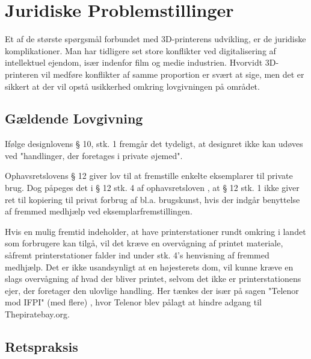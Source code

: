 
\section{Juridiske Problemstillinger}

Et af de største spørgsmål forbundet med 3D-printerens udvikling, er de juridiske komplikationer. Man har tidligere set store konflikter ved digitalisering af intellektuel ejendom, især indenfor film og medie industrien. Hvorvidt 3D-printeren vil medføre konflikter af samme proportion er svært at sige, men det er sikkert at der vil opstå usikkerhed omkring lovgivningen på området.

\subsection{Gældende Lovgivning}

Ifølge designlovens § 10, stk. 1 fremgår det tydeligt, at designret ikke kan udøves ved "handlinger, der foretages i private øjemed"\autocite{retsinformation.dk_designloven_2012}.

Ophavsretslovens § 12 giver lov til at fremstille enkelte eksemplarer til private brug.
Dog påpeges det i § 12 stk. 4 af ophavsretsloven \autocite{retsinformation.dk_ophavsretsloven_2010}, at § 12 stk. 1 ikke giver ret til kopiering til privat forbrug af bl.a. brugskunst, hvis der indgår benyttelse af fremmed medhjælp ved eksemplarfremstillingen.


Hvis en mulig fremtid indeholder, at have printerstationer rundt omkring i landet \autocite{bjorn_godske_dansk_2012} som forbrugere kan tilgå, vil det kræve en overvågning af printet materiale, såfremt printerstationer falder ind under stk. 4's henvisning af fremmed medhjælp. Det er ikke usandsynligt at en højesterets dom, vil kunne kræve en slags overvågning af hvad der bliver printet, selvom det ikke er printerstationens ejer, der foretager den ulovlige handling. Her tænkes der især på sagen "Telenor mod IFPI" (med flere) \autocite{domstol.dk_telenor_2010}, hvor Telenor blev pålagt at hindre adgang til Thepiratebay.org.

\subsection{Retspraksis}

